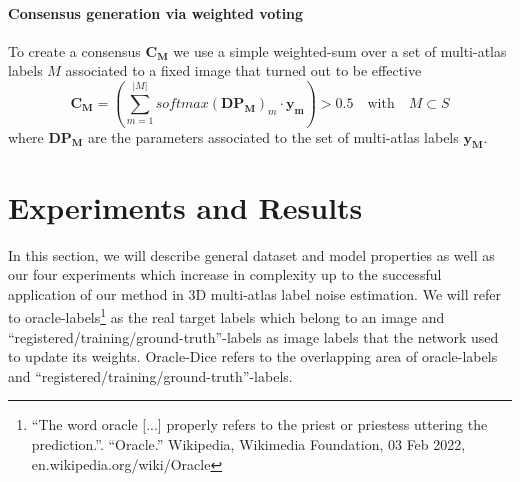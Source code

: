     \paragraph{\textbf{Consensus generation via weighted voting}}
        \label{sec:consensus}
        To create a consensus \(\mathbf{C_M}\) we use a simple weighted-sum over a set of multi-atlas labels \(M\) associated to a fixed image that turned out to be effective
        \begin{equation}
            \label{eq:weighted_sum}
            \mathbf{C_M} = \left(\sum_{m=1}^{\lvert M \rvert} softmax(\mathbf{DP_{M}})_{m} \cdot \mathbf{y_m}\right) > 0.5 \quad \textrm{with} \quad M \subset S
        \end{equation}
        where \(\mathbf{DP_{M}}\) are the parameters associated to the set of multi-atlas labels \(\mathbf{y_M}\).


\newpage
\section{Experiments and Results}
    \label{sec:experiments_deepstaple}
    In this section, we will describe general dataset and model properties as well as our four experiments which increase in complexity up to the successful application of our method in 3D multi-atlas label noise estimation. We will refer to oracle-labels\footnote{``The word oracle [...] properly refers to the priest or priestess uttering the prediction.''. ``Oracle.'' Wikipedia, Wikimedia Foundation, 03 Feb 2022, en.wikipedia.org/wiki/Oracle} as the real target labels which belong to an image and “registered/training/ground-truth”-labels as image labels that the network used to update its weights. Oracle-Dice refers to the overlapping area of oracle-labels and “registered/training/ground-truth”-labels.

